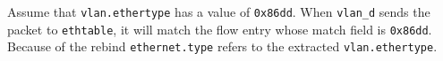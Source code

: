Assume that \texttt{vlan.ethertype} has a value of \texttt{0x86dd}.
When \texttt{vlan\_d} sends the packet to \texttt{ethtable}, it will
match the flow entry whose match field is \texttt{0x86dd}. Because of
the rebind \texttt{ethernet.type} refers to the extracted \texttt{vlan.ethertype}.

%
%	
%
%
%
%
%
%
%
%

